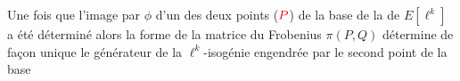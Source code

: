 \documentclass[10pt,a4paper]{beamer}
\theoremstyle{plain}
\theoremstyle{definition}
\theoremstyle{definition}
\theoremstyle{definition}
\theoremstyle{definition}
\theoremstyle{remark}
\theoremstyle{remark}
\begin{document}
\begin{frame}
\begin{center}
\end{center}
Une fois que l'image par $\phi$ d'un des deux points ($\color{red} P$) de la base de la de $E[\ell^{k}]$ a été déterminé alors la forme de la matrice du Frobenius $\pi(P,Q)$ détermine de façon unique le générateur de la $\ell^k$-isogénie engendrée par le second point de la base
\end{frame}

\end{document}
